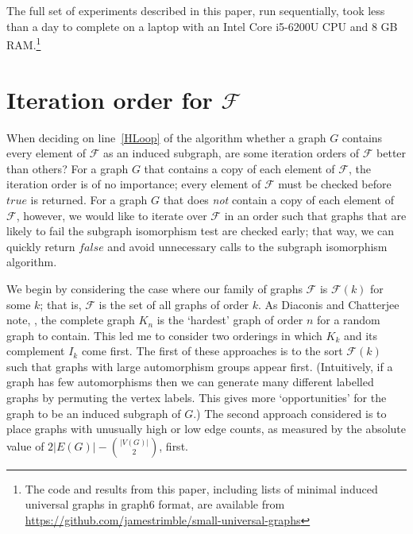 \documentclass[12pt]{article}
\newcommand{\calF}{\ensuremath{\mathcal{F}}}
\newcommand{\AlgVar}[1]{\mathit{#1}}
\newcommand{\lineref}[1]{line~\ref{#1}}
\begin{document}
The full set of experiments described in this paper, run sequentially,
took less than a day to complete on a laptop with an Intel Core i5-6200U CPU
and 8 GB RAM.\footnote{The code and
results from this paper, including lists of minimal induced universal graphs
in graph6 format, are available from
\url{https://github.com/jamestrimble/small-universal-graphs}}

\section{Iteration order for $\calF$}\label{sec:iteration-order}

When deciding on \lineref{HLoop} of the algorithm whether a graph $G$ contains
every element of $\calF$ as an induced subgraph, are some iteration orders of
$\calF$ better than others?  For a graph $G$ that contains a copy of each
element of $\calF$, the iteration order is of no importance;
every element of $\calF$ must be checked before $\AlgVar{true}$ is returned.
For a graph $G$ that
does \emph{not} contain a copy of each element of $\calF$, however, we would like
to iterate over $\calF$ in an order such that graphs that are likely to fail the
subgraph isomorphism test are checked early; that way, we can quickly return
$\AlgVar{false}$ and avoid unnecessary calls to the subgraph isomorphism algorithm.

We begin by considering the case where our family of graphs $\calF$
is $\calF(k)$ for some $k$; that is,
$\calF$ is the set of all graphs of order $k$.
As Diaconis and Chatterjee note, \cite{chatterjee2021isomorphisms}, the complete
graph $K_n$ is the `hardest' graph of order $n$ for a random graph to contain.
This led me
to consider two orderings in which $K_k$ and its complement $I_k$ come
first.  The first of these approaches is to the sort $\calF(k)$ such that
graphs with large automorphism groups appear first.  (Intuitively, if a graph
has few automorphisms then we can generate many different labelled graphs
by permuting the vertex labels.  This gives more `opportunities' for the
graph to be an induced subgraph of $G$.)
The second approach considered is to place graphs
with unusually high or low edge counts, as measured by the absolute value of
${2|E(G)| - {|V(G)| \choose 2}}$, first.
\end{document}
